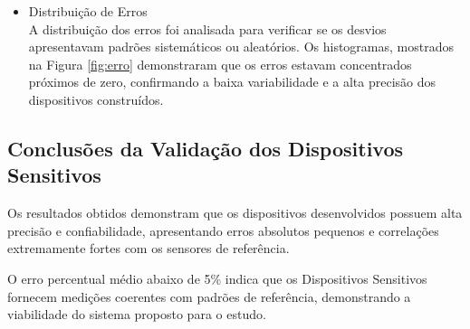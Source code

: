 \begin{itemize}
		\item Distribuição de Erros\\
		A distribuição dos erros foi analisada para verificar se os desvios apresentavam padrões sistemáticos ou aleatórios. Os histogramas, mostrados na Figura \ref{fig:erro} demonstraram que os erros estavam concentrados próximos de zero, confirmando a baixa variabilidade e a alta precisão dos dispositivos construídos.


	\end{itemize}

\subsection{Conclusões da Validação dos Dispositivos Sensitivos}
	Os resultados obtidos demonstram que os dispositivos desenvolvidos possuem alta precisão e confiabilidade, apresentando erros absolutos pequenos e correlações extremamente fortes com os sensores de referência. 
    
    O erro percentual médio abaixo de 5\% indica que os Dispositivos Sensitivos fornecem medições coerentes com padrões de referência, demonstrando a viabilidade do sistema proposto para o estudo.